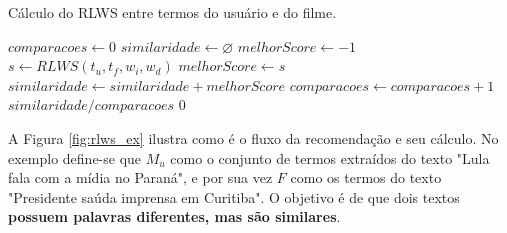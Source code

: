 \begin{algorithm}
	\caption{Cálculo do RLWS entre termos do usuário e do filme.}
	\begin{algorithmic}[1]
        	\State $comparacoes \gets 0$
        	\State $similaridade \gets \varnothing$
        		\State $melhorScore\gets -1$
        			\State $s \gets RLWS(t_u, t_f, w_i, w_d)$
        				\State $melhorScore \gets s$
        			\EndIf
        		\EndFor
        			\State $similaridade \gets similaridade + melhorScore$
        			\State $comparacoes \gets comparacoes + 1$
        		\EndIf        		      	
        	\EndFor
				\Return $similaridade / comparacoes$
			\Else
				\Return $0$
			\EndIf
        \EndFunction
    \end{algorithmic}
\end{algorithm}

A Figura \ref{fig:rlws_ex} ilustra como é o fluxo da recomendação e seu cálculo. No exemplo define-se que $M_u$ como o conjunto de termos extraídos do texto "Lula fala com a mídia no Paraná", e por sua vez $F$ como os termos do texto "Presidente saúda imprensa em Curitiba". O objetivo é de que dois textos \textbf{possuem palavras diferentes, mas são similares}.

